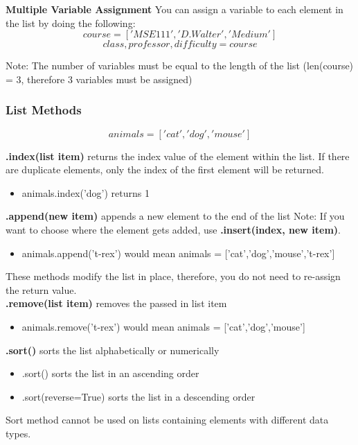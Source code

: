 \textbf{Multiple Variable Assignment}
You can assign a variable to each element in the list by doing the following:
\[course = ['MSE 111', 'D. Walter', 'Medium']\]
\[class,professor,difficulty = course\]

Note: The number of variables must be equal to the length of the list (len(course) = 3, therefore 3 variables must be assigned)

\newpage
\subsubsection{List Methods}
\[animals = ['cat', 'dog', 'mouse']\]

\textbf{.index(list item)} returns the index value of the element within the list. If there are duplicate elements, only the index of the first element will be returned.
\begin{itemize}
    \item animals.index('dog') returns 1
\end{itemize}
\vspace{0.2cm}

\textbf{.append(new item)} appends a new element to the end of the list
Note: If you want to choose where the element gets added, use \textbf{.insert(index, new item)}.
\begin{itemize}
    \item animals.append('t-rex') would mean animals = ['cat','dog','mouse','t-rex']
\end{itemize}
These methods modify the list in place, therefore, you do not need to re-assign the return value.\\


\textbf{.remove(list item)} removes the passed in list item
\begin{itemize}
    \item animals.remove('t-rex') would mean animals = ['cat','dog','mouse']
\end{itemize}

\vspace{0.2cm}
\textbf{.sort()} sorts the list alphabetically or numerically
\begin{itemize}
    \item .sort() sorts the list in an ascending order
    \item .sort(reverse=True) sorts the list in a descending order
\end{itemize}
Sort method cannot be used on lists containing elements with different data types.

